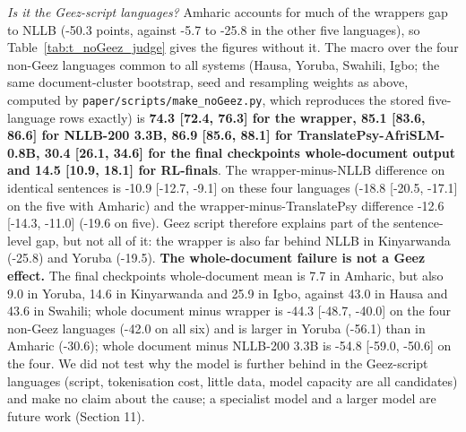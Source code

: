 \emph{Is it the Ge\textquotesingle ez-script languages?} Amharic accounts for much of the wrapper\textquotesingle s gap to NLLB (-50.3 points, against -5.7 to -25.8 in the other five languages), so Table~\ref{tab:t_noGeez_judge} gives the figures without it. The macro over the four non-Ge\textquotesingle ez languages common to all systems (Hausa, Yoruba, Swahili, Igbo; the same document-cluster bootstrap, seed and resampling weights as above, computed by \texttt{paper/scripts/make\_noGeez.py}, which reproduces the stored five-language rows exactly) is \textbf{74.3 {[}72.4, 76.3{]} for the wrapper, 85.1 {[}83.6, 86.6{]} for NLLB-200 3.3B, 86.9 {[}85.6, 88.1{]} for TranslatePsy-AfriSLM-0.8B, 30.4 {[}26.1, 34.6{]} for the final checkpoint\textquotesingle s whole-document output and 14.5 {[}10.9, 18.1{]} for RL-final\textquotesingle s}. The wrapper-minus-NLLB difference on identical sentences is -10.9 {[}-12.7, -9.1{]} on these four languages (-18.8 {[}-20.5, -17.1{]} on the five with Amharic) and the wrapper-minus-TranslatePsy difference -12.6 {[}-14.3, -11.0{]} (-19.6 on five). Ge\textquotesingle ez script therefore explains part of the sentence-level gap, but not all of it: the wrapper is also far behind NLLB in Kinyarwanda (-25.8) and Yoruba (-19.5). \textbf{The whole-document failure is not a Ge\textquotesingle ez effect.} The final checkpoint\textquotesingle s whole-document mean is 7.7 in Amharic, but also 9.0 in Yoruba, 14.6 in Kinyarwanda and 25.9 in Igbo, against 43.0 in Hausa and 43.6 in Swahili; whole document minus wrapper is -44.3 {[}-48.7, -40.0{]} on the four non-Ge\textquotesingle ez languages (-42.0 on all six) and is larger in Yoruba (-56.1) than in Amharic (-30.6); whole document minus NLLB-200 3.3B is -54.8 {[}-59.0, -50.6{]} on the four. We did not test why the model is further behind in the Ge\textquotesingle ez-script languages (script, tokenisation cost, little data, model capacity are all candidates) and make no claim about the cause; a specialist model and a larger model are future work (Section 11).

